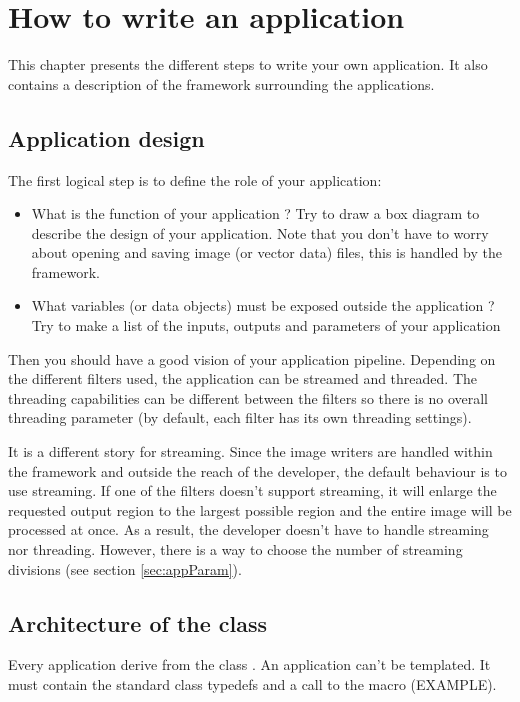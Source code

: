 \chapter{How to write an application}
\label{sec:writeAnApplication}

This chapter presents the different steps to write your own application.
It also contains a description of the framework surrounding the applications.

\section{Application design}
\label{sec:appDesign}
The first logical step is to define the role of your application:
\begin{itemize}
  \item What is the function of your application ? Try to draw a box diagram to 
  describe the design of your application. Note that you don't have to worry 
  about opening and saving image (or vector data) files, this is handled by the 
  framework.
  \item What variables (or data objects) must be exposed outside the application ?
  Try to make a list of the inputs, outputs and parameters of your application
\end{itemize}
Then you should have a good vision of your application pipeline. Depending on the 
different filters used, the application can be streamed and threaded. The threading
capabilities can be different between the filters so there is no overall threading 
parameter (by default, each filter has its own threading settings). 

It is a different story for streaming. Since the image writers are handled within 
the framework and outside the reach of the developer, the default behaviour is to 
use streaming. If one of the filters doesn't support streaming, it will enlarge 
the requested output region to the largest possible region and the entire image 
will be processed at once. As a result, the developer doesn't have to handle  
streaming nor threading. However, there is a way to choose the number of streaming 
divisions (see section \ref{sec:appParam}).

\section{Architecture of the class}
\label{sec:appArchitecture}
Every application derive from the class . An 
application can't be templated. It must contain the standard class typedefs and
a call to the  macro (EXAMPLE).

